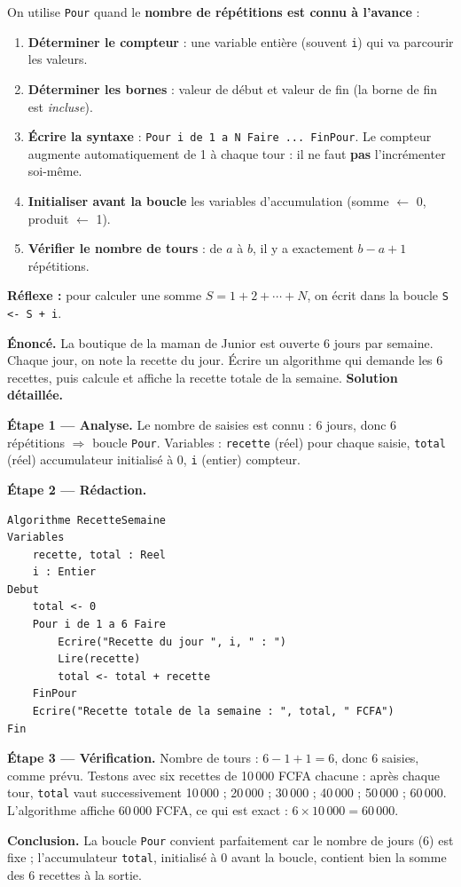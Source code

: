 \documentclass[11pt]{article}
\newcounter{popsec}
\newcounter{popsub}
\newcommand{\courssub}[1]{%
  \stepcounter{popsub}%
  \par\vspace{9pt}\noindent{\popxbold\fontsize{11.5}{13}\selectfont\color{popink}{\color{poporange}\thepopsec.\thepopsub}\hspace{6pt}#1}\par\nopagebreak\vspace{4pt}
}
\begin{document}
\courssub{Méthode 4 : Utiliser la boucle « Pour »}

\begin{methode}
On utilise \texttt{Pour} quand le \textbf{nombre de répétitions est connu à l'avance} :
\begin{enumerate}
\item \textbf{Déterminer le compteur} : une variable entière (souvent \texttt{i}) qui va parcourir les valeurs.
\item \textbf{Déterminer les bornes} : valeur de début et valeur de fin (la borne de fin est \emph{incluse}).
\item \textbf{Écrire la syntaxe} : \texttt{Pour i de 1 a N Faire ... FinPour}. Le compteur augmente automatiquement de 1 à chaque tour : il ne faut \textbf{pas} l'incrémenter soi-même.
\item \textbf{Initialiser avant la boucle} les variables d'accumulation (somme $\leftarrow$ 0, produit $\leftarrow$ 1).
\item \textbf{Vérifier le nombre de tours} : de $a$ à $b$, il y a exactement $b - a + 1$ répétitions.
\end{enumerate}
\textbf{Réflexe :} pour calculer une somme $S = 1 + 2 + \cdots + N$, on écrit dans la boucle \texttt{S <- S + i}.
\end{methode}

\begin{exoresolu}
\textbf{Énoncé.} La boutique de la maman de Junior est ouverte 6 jours par semaine. Chaque jour, on note la recette du jour. Écrire un algorithme qui demande les 6 recettes, puis calcule et affiche la recette totale de la semaine.
\tcblower
\textbf{Solution détaillée.}

\textbf{Étape 1 — Analyse.} Le nombre de saisies est connu : 6 jours, donc 6 répétitions $\Rightarrow$ boucle \texttt{Pour}. Variables : \texttt{recette} (réel) pour chaque saisie, \texttt{total} (réel) accumulateur initialisé à 0, \texttt{i} (entier) compteur.

\textbf{Étape 2 — Rédaction.}
\begin{lstlisting}
Algorithme RecetteSemaine
Variables
    recette, total : Reel
    i : Entier
Debut
    total <- 0
    Pour i de 1 a 6 Faire
        Ecrire("Recette du jour ", i, " : ")
        Lire(recette)
        total <- total + recette
    FinPour
    Ecrire("Recette totale de la semaine : ", total, " FCFA")
Fin
\end{lstlisting}

\textbf{Étape 3 — Vérification.} Nombre de tours : $6 - 1 + 1 = 6$, donc 6 saisies, comme prévu. Testons avec six recettes de 10\,000 FCFA chacune : après chaque tour, \texttt{total} vaut successivement 10\,000 ; 20\,000 ; 30\,000 ; 40\,000 ; 50\,000 ; 60\,000. L'algorithme affiche 60\,000 FCFA, ce qui est exact : $6 \times 10\,000 = 60\,000$.

\textbf{Conclusion.} La boucle \texttt{Pour} convient parfaitement car le nombre de jours (6) est fixe ; l'accumulateur \texttt{total}, initialisé à 0 avant la boucle, contient bien la somme des 6 recettes à la sortie.
\end{exoresolu}
\end{document}
